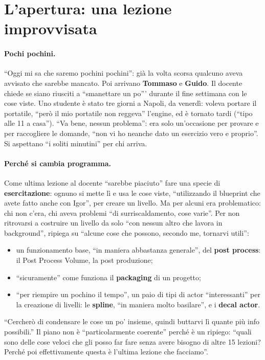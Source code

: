 \section{L'apertura: una lezione improvvisata}
\label{ue16:sec:apertura}

\paragraph{Pochi pochini.} ``Oggi mi sa che saremo pochini pochini'': già la volta scorsa
qualcuno aveva avvisato che sarebbe mancato. Poi arrivano \textbf{Tommaso} e \textbf{Guido}.
Il docente chiede se siano riusciti a ``smanettare un po''' durante il fine settimana con le
cose viste. Uno studente è stato tre giorni a Napoli, da venerdì: voleva portare il
portatile, ``però il mio portatile non reggeva'' l'engine, ed è tornato tardi (``tipo alle 11
a casa''). ``Va bene, nessun problema'': era solo un'occasione per provare e per raccogliere
le domande, ``non vi ho neanche dato un esercizio vero e proprio''. Si aspettano ``i soliti
minutini'' per chi arriva.

\paragraph{Perché si cambia programma.} Come ultima lezione al docente ``sarebbe piaciuto''
fare una specie di \textbf{esercitazione}: ognuno si mette lì e usa le cose viste,
``utilizzando il blueprint che avete fatto anche con Igor'', per creare un livello. Ma per
alcuni era problematico: chi non c'era, chi aveva problemi ``di surriscaldamento, cose
varie''. Per non ritrovarsi a costruire un livello da solo ``con nessun altro che lavora in
background'', ripiega su ``alcune cose che possono, secondo me, tornarvi utili'':
\begin{itemize}
  \item un funzionamento base, ``in maniera abbastanza generale'', del \textbf{post process}:
        il Post Process Volume, la post produzione;
  \item ``sicuramente'' come funziona il \textbf{packaging} di un progetto;
  \item ``per riempire un pochino il tempo'', un paio di tipi di actor ``interessanti'' per
        la creazione di livelli: le \textbf{spline}, ``in maniera molto basilare'', e i
        \textbf{decal actor}.
\end{itemize}
``Cercherò di condensare le cose un po' insieme, quindi buttarvi lì quante più info
possibili.'' Il piano non è ``particolarmente coerente'' perché è un ripiego: ``quali sono
delle cose veloci che gli posso far fare senza avere bisogno di altre 15 lezioni? Perché poi
effettivamente questa è l'ultima lezione che facciamo''.

